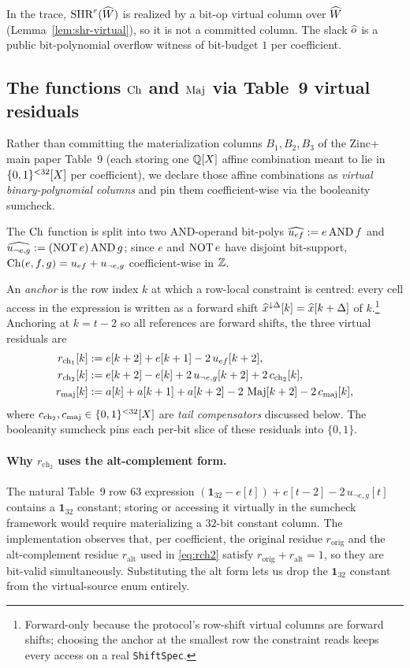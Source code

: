 In the trace, $\operatorname{SHR}^{r}(\widehat{W})$ is realized by a bit-op virtual column
over $\widehat{W}$ (Lemma~\ref{lem:shr-virtual}), so it is not a committed
column. The slack $\widehat{o}$ is a public bit-polynomial overflow witness
of bit-budget $1$ per coefficient.

\subsection{The functions $\operatorname{Ch}$ and $\operatorname{Maj}$ via Table~9 virtual residuals}
\label{sec:ch-maj}

Rather than committing the materialization columns
$B_1,B_2,B_3$ of the Zinc+ main paper Table~9 (each storing one $\mathbb{Q}[X]$ affine
combination meant to lie in $\{0,1\}^{<32}[X]$ per coefficient), we declare
those affine combinations as \emph{virtual binary-polynomial columns}
and pin them coefficient-wise via the booleanity sumcheck.

The $\operatorname{Ch}$ function is split into two AND-operand bit-polys
$\widehat{u_{ef}} := e \operatorname{AND} f$ and $\widehat{u_{\neg e,g}} := (\operatorname{NOT} e) \operatorname{AND} g$; since
$e$ and $\operatorname{NOT} e$ have disjoint bit-support, $\operatorname{Ch}(e,f,g) = u_{ef} + u_{\neg e,g}$
coefficient-wise in $\mathbb{Z}$.

An \emph{anchor} is the row index $k$ at which a row-local
constraint is centred: every cell access in the expression is written
as a forward shift $\widehat{x}^{\downarrow\Delta}[k] = \widehat{x}[k+\Delta]$
of $k$.\footnote{Forward-only because the protocol's row-shift virtual
columns are forward shifts; choosing the anchor at the smallest row
the constraint reads keeps every access on a real \texttt{ShiftSpec}.}
Anchoring at $k = t-2$ so all references are forward shifts, the three
virtual residuals are
\begin{align}
r_{\mathrm{ch}_1}[k]
  &:= e[k+2] + e[k+1] - 2\,u_{ef}[k+2], \label{eq:rch1}\\
r_{\mathrm{ch}_2}[k]
  &:= e[k+2] - e[k] + 2\,u_{\neg e,g}[k+2] + 2\,c_{\mathrm{ch}_2}[k],
        \label{eq:rch2}\\
r_{\mathrm{maj}}[k]
  &:= a[k] + a[k+1] + a[k+2] - 2\,\operatorname{Maj}[k+2] - 2\,c_{\mathrm{maj}}[k],
        \label{eq:rmaj}
\end{align}
where $c_{\mathrm{ch}_2}, c_{\mathrm{maj}} \in \{0,1\}^{<32}[X]$ are
\emph{tail compensators} discussed below. The booleanity sumcheck pins
each per-bit slice of these residuals into $\{0,1\}$.

\paragraph{Why $r_{\mathrm{ch}_2}$ uses the alt-complement form.}
The natural Table~9 row 63 expression
$(\mathbf{1}_{32} - e[t]) + e[t-2] - 2\, u_{\neg e,g}[t]$ contains a
$\mathbf{1}_{32}$ constant; storing or accessing it virtually in the
sumcheck framework would require materializing a $32$-bit constant
column. The implementation observes that, per coefficient, the original
residue $r_{\mathrm{orig}}$ and the alt-complement residue
$r_{\mathrm{alt}}$ used in \eqref{eq:rch2} satisfy
$r_{\mathrm{orig}} + r_{\mathrm{alt}} = 1$, so they are bit-valid
simultaneously. Substituting the alt form lets us drop the
$\mathbf{1}_{32}$ constant from the virtual-source enum entirely.

